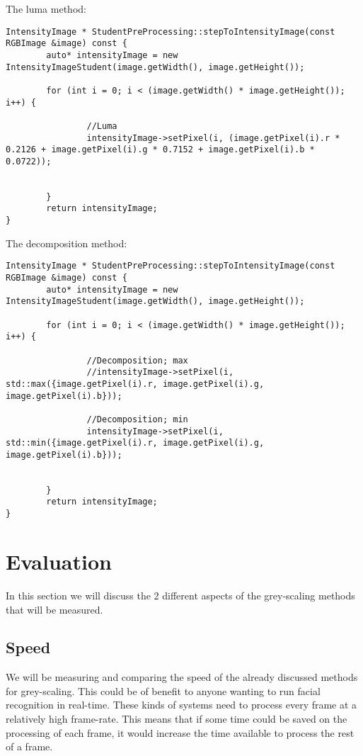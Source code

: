 \documentclass[a4paper]{article}
\begin{document}
The luma method:
\lstset{language=C++}
\begin{lstlisting}
IntensityImage * StudentPreProcessing::stepToIntensityImage(const RGBImage &image) const {
        auto* intensityImage = new IntensityImageStudent(image.getWidth(), image.getHeight());

        for (int i = 0; i < (image.getWidth() * image.getHeight()); i++) {

                //Luma
                intensityImage->setPixel(i, (image.getPixel(i).r * 0.2126 + image.getPixel(i).g * 0.7152 + image.getPixel(i).b * 0.0722));


        }
        return intensityImage;
}

\end{lstlisting}
\newpage

The decomposition method:
\lstset{language=C++}
\begin{lstlisting}
IntensityImage * StudentPreProcessing::stepToIntensityImage(const RGBImage &image) const {
        auto* intensityImage = new IntensityImageStudent(image.getWidth(), image.getHeight());

        for (int i = 0; i < (image.getWidth() * image.getHeight()); i++) {

                //Decomposition; max
                //intensityImage->setPixel(i, std::max({image.getPixel(i).r, image.getPixel(i).g, image.getPixel(i).b}));

                //Decomposition; min
                intensityImage->setPixel(i, std::min({image.getPixel(i).r, image.getPixel(i).g, image.getPixel(i).b}));


        }
        return intensityImage;
}

\end{lstlisting}

\section{Evaluation}
In this section we will discuss the 2 different aspects of the grey-scaling methods that will be measured.

\subsection{Speed}
We will be measuring and comparing the speed of the already discussed methods for grey-scaling. This could be of benefit to anyone wanting to run facial recognition in real-time. These kinds of systems need to process every frame at a relatively high frame-rate. This means that if some time could be saved on the processing of each frame, it would increase the time available to process the rest of a frame.
\end{document}
